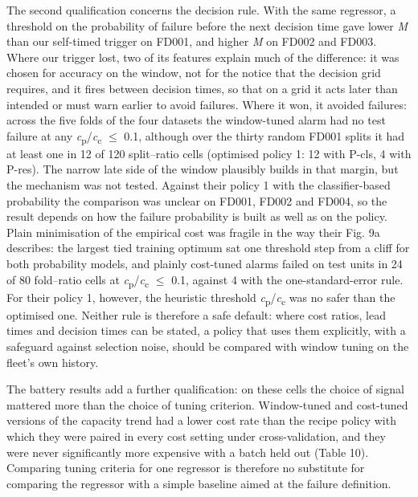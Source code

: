\documentclass[a4paper,fleqn,doubleblind]{cas-dc}
\begin{document}
The second qualification concerns the decision rule. With the same regressor, a threshold on the probability of failure before the next decision time gave lower \textit{M} than our self-timed trigger on FD001, and higher \textit{M} on FD002 and FD003. Where our trigger lost, two of its features explain much of the difference: it was chosen for accuracy on the window, not for the notice that the decision grid requires, and it fires between decision times, so that on a grid it acts later than intended or must warn earlier to avoid failures. Where it won, it avoided failures: across the five folds of the four datasets the window-tuned alarm had no test failure at any \textit{c}\textsubscript{p}/\textit{c}\textsubscript{c} $\le$ 0.1, although over the thirty random FD001 splits it had at least one in 12 of 120 split--ratio cells (optimised policy 1: 12 with P-cls, 4 with P-res). The narrow late side of the window plausibly builds in that margin, but the mechanism was not tested. Against their policy 1 with the classifier-based probability the comparison was unclear on FD001, FD002 and FD004, so the result depends on how the failure probability is built as well as on the policy. Plain minimisation of the empirical cost was fragile in the way their Fig. 9a describes: the largest tied training optimum sat one threshold step from a cliff for both probability models, and plainly cost-tuned alarms failed on test units in 24 of 80 fold--ratio cells at \textit{c}\textsubscript{p}/\textit{c}\textsubscript{c} $\le$ 0.1, against 4 with the one-standard-error rule. For their policy 1, however, the heuristic threshold \textit{c}\textsubscript{p}/\textit{c}\textsubscript{c} was no safer than the optimised one. Neither rule is therefore a safe default: where cost ratios, lead times and decision times can be stated, a policy that uses them explicitly, with a safeguard against selection noise, should be compared with window tuning on the fleet's own history.

The battery results add a further qualification: on these cells the choice of signal mattered more than the choice of tuning criterion. Window-tuned and cost-tuned versions of the capacity trend had a lower cost rate than the recipe policy with which they were paired in every cost setting under cross-validation, and they were never significantly more expensive with a batch held out (Table 10). Comparing tuning criteria for one regressor is therefore no substitute for comparing the regressor with a simple baseline aimed at the failure definition.
\end{document}
